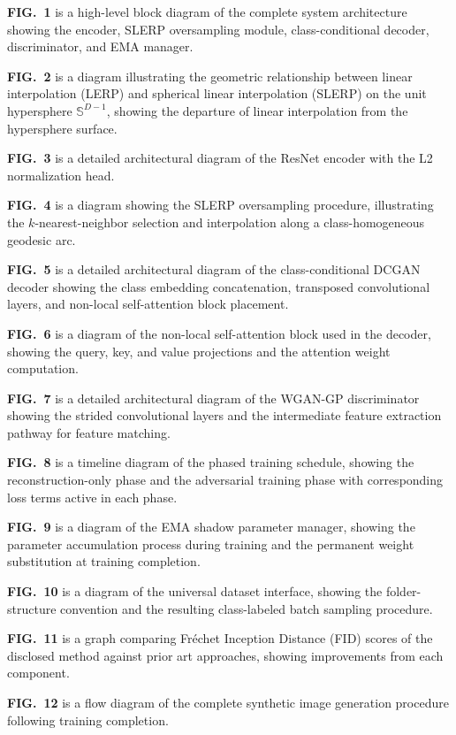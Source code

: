 \documentclass[12pt,letterpaper]{article}
\begin{document}
\textbf{FIG.\ 1} is a high-level block diagram of the complete system
architecture showing the encoder, SLERP oversampling module, class-conditional
decoder, discriminator, and EMA manager.

\textbf{FIG.\ 2} is a diagram illustrating the geometric relationship between
linear interpolation (LERP) and spherical linear interpolation (SLERP) on the
unit hypersphere $\mathbb{S}^{D-1}$, showing the departure of linear
interpolation from the hypersphere surface.

\textbf{FIG.\ 3} is a detailed architectural diagram of the ResNet encoder
with the L2 normalization head.

\textbf{FIG.\ 4} is a diagram showing the SLERP oversampling procedure,
illustrating the $k$-nearest-neighbor selection and interpolation along a
class-homogeneous geodesic arc.

\textbf{FIG.\ 5} is a detailed architectural diagram of the class-conditional
DCGAN decoder showing the class embedding concatenation, transposed
convolutional layers, and non-local self-attention block placement.

\textbf{FIG.\ 6} is a diagram of the non-local self-attention block used in
the decoder, showing the query, key, and value projections and the attention
weight computation.

\textbf{FIG.\ 7} is a detailed architectural diagram of the WGAN-GP
discriminator showing the strided convolutional layers and the intermediate
feature extraction pathway for feature matching.

\textbf{FIG.\ 8} is a timeline diagram of the phased training schedule,
showing the reconstruction-only phase and the adversarial training phase with
corresponding loss terms active in each phase.

\textbf{FIG.\ 9} is a diagram of the EMA shadow parameter manager, showing
the parameter accumulation process during training and the permanent weight
substitution at training completion.

\textbf{FIG.\ 10} is a diagram of the universal dataset interface, showing
the folder-structure convention and the resulting class-labeled batch sampling
procedure.

\textbf{FIG.\ 11} is a graph comparing Fr\'{e}chet Inception Distance (FID)
scores of the disclosed method against prior art approaches, showing
improvements from each component.

\textbf{FIG.\ 12} is a flow diagram of the complete synthetic image generation
procedure following training completion.
\end{document}
